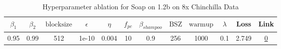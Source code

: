 \begin{table}[H]
\centering
\caption{Hyperparameter ablation for Soap on 1.2b on 8x Chinchilla Data}
\label{tab:ablation_soap_1.2b_8}
\begin{tabular}{cccccccccccc}
\toprule
$\beta_1$ & $\beta_2$ & $\mathrm{block size}$ & $\epsilon$ & $\eta$ & $f_{pc}$ & $\beta_{shampoo}$ & $\mathrm{BSZ}$ & $\mathrm{warmup}$ & $\lambda$ & Loss & Link \\
\midrule
0.95 & 0.99 & 512 & 1e-10 & 0.004 & 10 & 0.9 & 256 & 1000 & 0.1 & 2.749 & \href{https://wandb.ai/stanford-mercury/optimizer-scaling/runs/sweep-1.2b-193B-soapeweightf32ebf088lr0.004-wd0.1-minlr0.0-warmu-029405}{0} \\
\midrule
\bottomrule
\end{tabular}
\end{table}

